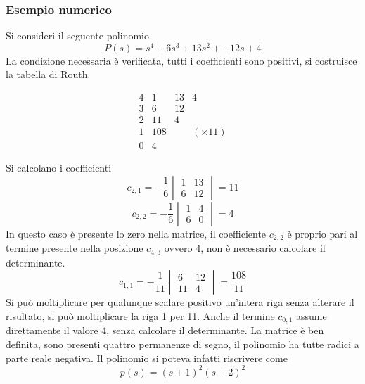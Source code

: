 \subsubsection{Esempio numerico}
Si consideri il seguente polinomio
$$
P(s) = s^4+6s^3 + 13s^2 + +12s +4
$$
La condizione necessaria è verificata, tutti i coefficienti sono positivi, si
costruisce la tabella di Routh.
\begin{table}[h]
$$
\begin{array}{c|ccc}
4 & 1 & 13 & 4\\
3 & 6 & 12 \\ \hline
2 & 11 & 4 \\
1 & 108 & & (\times11)\\
0 & 4
\end{array}
$$
\end{table}
Si calcolano i coefficienti
$$
c_{2,1} = -\frac{1}{6}\begin{vmatrix}
1 & 13\\
6 & 12
\end{vmatrix} = 11
$$
$$
c_{2,2} = -\frac{1}{6}\begin{vmatrix}
1 & 4\\
6 & 0
\end{vmatrix} = 4
$$
In questo caso è presente lo zero nella matrice, il coefficiente $c_{2,2}$ è
proprio pari al termine presente nella posizione
$c_{4,3}$ ovvero 4, non è necessario calcolare il determinante.
$$
c_{1,1} = -\frac{1}{11}\begin{vmatrix}
6 & 12 \\
11 & 4
\end{vmatrix} = \frac{108}{11}
$$
Si può moltiplicare per qualunque scalare positivo un'intera riga senza
alterare il risultato, si può moltiplicare la riga 1 per 11.
Anche il termine $c_{0,1}$ assume direttamente il valore 4, senza calcolare il
determinante.
La matrice è ben definita, sono presenti quattro permanenze di segno, il
polinomio ha tutte radici a parte reale negativa. Il polinomio si poteva
infatti riscrivere come
$$
p(s) = (s+1)^2(s+2)^2
$$

